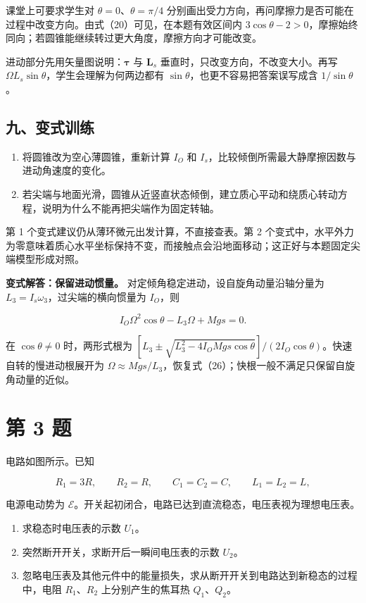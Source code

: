 \documentclass[12pt,a4paper,UTF8]{ctexart}
\newcommand{\tightlist}{\setlength{\itemsep}{0pt}\setlength{\parskip}{0pt}}
\begin{document}
课堂上可要求学生对 \(\theta=0\)、\(\theta=\pi/4\)
分别画出受力方向，再问摩擦力是否可能在过程中改变方向。由式（20）可见，在本题有效区间内
\(3\cos\theta-2>0\)，摩擦始终同向；若圆锥能继续转过更大角度，摩擦方向才可能改变。

进动部分先用矢量图说明：\(\bm\tau\) 与 \(\bm L_s\)
垂直时，只改变方向，不改变大小。再写
\(\Omega L_s\sin\theta\)，学生会理解为何两边都有
\(\sin\theta\)，也更不容易把答案误写成含 \(1/\sin\theta\)。

\subsection{九、变式训练}\label{ux4e5dux53d8ux5f0fux8badux7ec3-1}

\begin{enumerate}
\def\labelenumi{\arabic{enumi}.}
\tightlist
\item
  将圆锥改为空心薄圆锥，重新计算 \(I_O\) 和
  \(I_s\)，比较倾倒所需最大静摩擦因数与进动角速度的变化。
\item
  若尖端与地面光滑，圆锥从近竖直状态倾倒，建立质心平动和绕质心转动方程，说明为什么不能再把尖端作为固定转轴。
\end{enumerate}

第 1 个变式建议仍从薄环微元出发计算，不直接查表。第 2
个变式中，水平外力为零意味着质心水平坐标保持不变，而接触点会沿地面移动；这正好与本题固定尖端模型形成对照。

\textbf{变式解答：保留进动惯量。}
对定倾角稳定进动，设自旋角动量沿轴分量为
\(L_3=I_s\omega_3\)，过尖端的横向惯量为 \(I_O\)，则

\[I_O\Omega^2\cos\theta-L_3\Omega+Mgs=0.\]

在 \(\cos\theta\ne0\) 时，两形式根为
\([L_3\pm\sqrt{L_3^2-4I_OMgs\cos\theta}]/(2I_O\cos\theta)\)。快速自转的慢进动根展开为
\(\Omega\approx Mgs/L_3\)，恢复式（26）；快根一般不满足只保留自旋角动量的近似。

\newpage

\section{第 3 题}\label{ux7b2c-3-ux9898}

电路如图所示。已知

\[R_1=3R,\qquad R_2=R,\qquad C_1=C_2=C,\qquad L_1=L_2=L,\]

电源电动势为
\(\mathcal E\)。开关起初闭合，电路已达到直流稳态，电压表视为理想电压表。

\begin{enumerate}
\def\labelenumi{\arabic{enumi}.}
\tightlist
\item
  求稳态时电压表的示数 \(U_1\)。
\item
  突然断开开关，求断开后一瞬间电压表的示数 \(U_2\)。
\item
  忽略电压表及其他元件中的能量损失，求从断开开关到电路达到新稳态的过程中，电阻
  \(R_1\)、\(R_2\) 上分别产生的焦耳热 \(Q_1\)、\(Q_2\)。
\end{enumerate}
\end{document}
